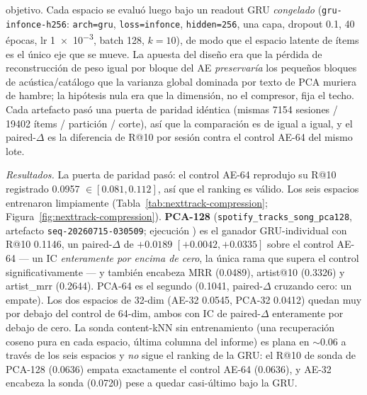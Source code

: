 \documentclass[11pt]{article}
\newcommand{\runid}[1]{\texttt{\small\seqsplit{#1}}}
\newcommand{\dsid}[1]{\texttt{\small #1}}
\begin{document}
objetivo. Cada espacio se evaluó luego bajo un readout GRU \emph{congelado}
(\texttt{gru-infonce-h256}: \texttt{arch=gru}, \texttt{loss=infonce},
\texttt{hidden=256}, una capa, dropout 0.1, 40 épocas, lr \num{1e-3}, batch 128,
$k{=}10$), de modo que el espacio latente de ítems es el único eje que se mueve. La
apuesta del diseño era que la pérdida de reconstrucción de peso igual por bloque del
AE \emph{preservaría} los pequeños bloques de acústica/catálogo que la varianza
global dominada por texto de PCA muriera de hambre; la hipótesis nula era que la
dimensión, no el compresor, fija el techo. Cada artefacto pasó una puerta de
paridad idéntica (mismas \num{7154} sesiones / \num{19402} ítems / partición /
corte), así que la comparación es de igual a igual, y el paired-$\Delta$ es la
diferencia de R@10 por sesión contra el control AE-64 del mismo lote.

\emph{Resultados.} La puerta de paridad pasó: el control AE-64 reprodujo su R@10
registrado \num{0.0957} $\in [0.081, 0.112]$, así que el ranking es válido. Los seis
espacios entrenaron limpiamente (Tabla~\ref{tab:nexttrack-compression};
Figura~\ref{fig:nexttrack-compression}). \textbf{PCA-128}
(\dsid{spotify\_tracks\_song\_pca128}, artefacto \texttt{seq-20260715-030509};
ejecución \runid{run-20260715-042100-a1d9d}) es el ganador GRU-individual con R@10
\num{0.1146}, un paired-$\Delta$ de $+\num{0.0189}$ $[+0.0042, +0.0335]$ sobre el
control AE-64 --- un IC \emph{enteramente por encima de cero}, la única rama que
supera el control significativamente --- y también encabeza MRR (\num{0.0489}),
artist@10 (\num{0.3326}) y artist\_mrr (\num{0.2644}). PCA-64 es el segundo
(\num{0.1041}, paired-$\Delta$ cruzando cero: un empate). Los dos espacios de 32-dim
(AE-32 \num{0.0545}, PCA-32 \num{0.0412}) quedan muy por debajo del control de
64-dim, ambos con IC de paired-$\Delta$ enteramente por debajo de cero. La sonda
content-kNN sin entrenamiento (una recuperación coseno pura en cada espacio, última
columna del informe) es plana en $\sim$0.06 a través de los seis espacios y \emph{no}
sigue el ranking de la GRU: el R@10 de sonda de PCA-128 (\num{0.0636}) empata
exactamente el control AE-64 (\num{0.0636}), y AE-32 encabeza la sonda (\num{0.0720})
pese a quedar casi-último bajo la GRU.
\end{document}
